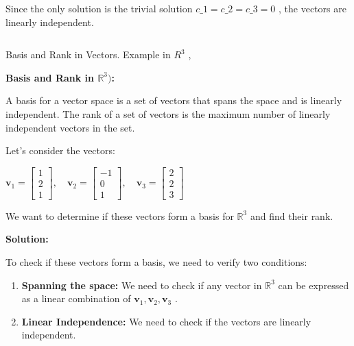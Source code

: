 \documentclass[11pt]{article}
\makeatletter
\newcommand{\boxspacing}{\kern\kvtcb@left@rule\kern\kvtcb@boxsep}
\newcommand{\prompt}[4]{
        {\ttfamily\llap{{\color{#2}[#3]:\hspace{3pt}#4}}\vspace{-\baselineskip}}
    }
\makeatother
\begin{document}
Since the only solution is the trivial solution $  c\_1 = c\_2 = c\_3 =
0$  , the vectors are linearly independent.

    \begin{tcolorbox}[breakable, size=fbox, boxrule=1pt, pad at break*=1mm,colback=cellbackground, colframe=cellborder]
\prompt{In}{incolor}{ }{\boxspacing}
\begin{Verbatim}[commandchars=\\\{\}]

\end{Verbatim}
\end{tcolorbox}

    Basis and Rank in Vectors. Example in $  R^3 $ ,

    \textbf{Basis and Rank in $  \mathbb{R}^3)$:}

A basis for a vector space is a set of vectors that spans the space and
is linearly independent. The rank of a set of vectors is the maximum
number of linearly independent vectors in the set.

Let's consider the vectors:

$  \mathbf{v}_1 =\begin{bmatrix} 1 \\ 2 \\ 1 \end{bmatrix}, \quad \mathbf{v}_2 =\begin{bmatrix} -1 \\ 0 \\ 1 \end{bmatrix}, \quad \mathbf{v}_3 =\begin{bmatrix} 2 \\ 2 \\ 3 \end{bmatrix}$ 

We want to determine if these vectors form a basis for $ \mathbb{R}^3$  and find their rank.

\textbf{Solution:}

To check if these vectors form a basis, we need to verify two
conditions:

\begin{enumerate}
\def\labelenumi{\arabic{enumi}.}
\item
  \textbf{Spanning the space:} We need to check if any vector in $ 
  \mathbb{R}^3$  can be expressed as a linear combination of $ 
  \mathbf{v}_1, \mathbf{v}_2, \mathbf{v}_3$  .
\item
  \textbf{Linear Independence:} We need to check if the vectors are
  linearly independent.
\end{enumerate}
\end{document}
